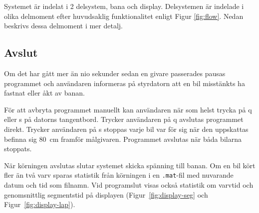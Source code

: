 Systemet är indelat i 2 delsystem, bana och display. Delsystemen är indelade i olika delmoment efter huvudsaklig funktionalitet enligt Figur
\ref{fig:flow}. Nedan beskrivs dessa delmoment i mer detalj.






\subsection{Avslut}

Om det har gått mer än nio sekunder sedan en givare passerades pausas programmet
och användaren informeras på styrdatorn att en bil misstänkts ha fastnat eller
åkt av banan. 

För att avbryta programmet manuellt kan användaren när som helst trycka på q
eller s på datorns tangentbord. Trycker användaren på q avslutas programmet
direkt. Trycker användaren på s stoppas varje bil var för sig när den uppskattas
befinna sig 80~cm framför målgivaren. Programmet avslutas när båda bilarna
stoppats.

När körningen avslutas slutar systemet skicka spänning till banan.  Om en bil
kört fler än två varv sparas statistik från körningen i en \texttt{.mat}-fil med
nuvarande datum och tid som filnamn. Vid programslut visas också statistik om
varvtid och genomsnittlig segmentstid på displayen (Figur~\ref{fig:display-seg}
och Figur~\ref{fig:display-lap}).

